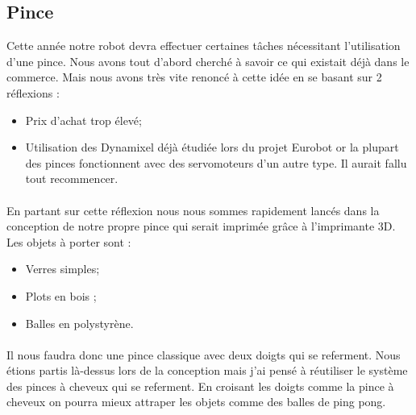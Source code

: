 \subsection{Pince}
Cette année notre robot devra effectuer certaines tâches nécessitant l’utilisation d’une pince. Nous avons tout d’abord cherché à savoir ce qui existait déjà dans le commerce. Mais nous avons très vite renoncé à cette idée en se basant sur 2 réflexions : 

\begin{itemize}
    \item Prix d’achat trop élevé;
    \item Utilisation des Dynamixel déjà étudiée lors du projet Eurobot or la plupart des pinces fonctionnent avec des servomoteurs d’un autre type. Il aurait fallu tout recommencer.
\end{itemize}

\paragraph{}
En partant sur cette réflexion nous nous sommes rapidement lancés dans la conception de notre propre pince qui serait imprimée grâce à l’imprimante 3D. Les objets à porter sont :

\begin{itemize}
\item Verres simples;
\item Plots en bois ;
\item Balles en polystyrène.
\end{itemize}

\paragraph{}
Il nous faudra donc une pince classique avec deux doigts qui se referment. Nous étions partis là-dessus lors de la conception mais j’ai pensé à réutiliser le système des pinces à cheveux qui se referment. En croisant les doigts comme la pince à cheveux on pourra mieux attraper les objets comme des balles de ping pong.

